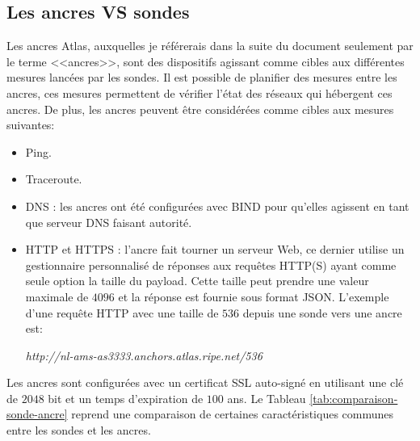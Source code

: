 \subsection{Les ancres VS sondes} \label{subsec:ancre}
Les ancres Atlas, auxquelles je référerais dans la suite du document seulement par le terme <<ancres>>, sont des dispositifs agissant comme cibles aux différentes mesures lancées par les sondes. Il est possible de planifier des mesures entre les ancres, ces mesures permettent de vérifier l'état des réseaux qui hébergent ces ancres. De plus, les ancres  peuvent être considérées comme  cibles aux mesures suivantes:
\begin{itemize}
	\item Ping.
	\item Traceroute.
	\item DNS : les ancres ont été configurées avec BIND pour qu'elles agissent en tant que serveur DNS faisant autorité.
	\item HTTP et HTTPS : l'ancre fait tourner un serveur Web, ce dernier utilise un gestionnaire  personnalisé de réponses aux requêtes HTTP(S) ayant comme seule option la taille du payload. 	 Cette taille peut prendre une valeur maximale de $4096$ et la réponse est fournie sous format JSON. L'exemple d'une requête HTTP avec une taille de $536$ depuis une sonde  vers une ancre  est: 
	\begin{tcolorbox}
		\textit{http://nl-ams-as3333.anchors.atlas.ripe.net/536}
	\end{tcolorbox}
\end{itemize}
Les ancres sont configurées avec un certificat SSL auto-signé en utilisant une clé de $2048$ bit et un temps d'expiration de $100$ ans. Le Tableau \ref{tab:comparaison-sonde-ancre} reprend une comparaison de certaines caractéristiques communes entre les sondes et les ancres.

